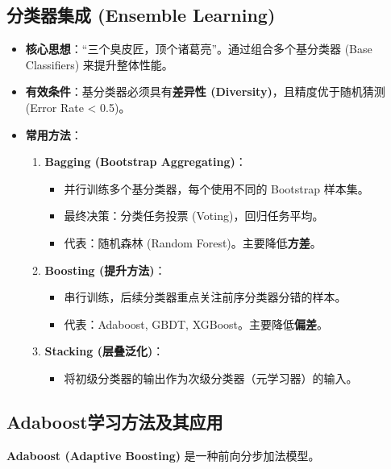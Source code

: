 \documentclass[a4paper, 11pt]{ctexart}
\begin{document}
\subsection{分类器集成 (Ensemble Learning)}
\begin{itemize}
    \item \textbf{核心思想}：“三个臭皮匠，顶个诸葛亮”。通过组合多个基分类器 (Base Classifiers) 来提升整体性能。
    \item \textbf{有效条件}：基分类器必须具有\textbf{差异性 (Diversity)}，且精度优于随机猜测 (Error Rate < 0.5)。
    \item \textbf{常用方法}：
    \begin{enumerate}
        \item \textbf{Bagging (Bootstrap Aggregating)}：
        \begin{itemize}
            \item 并行训练多个基分类器，每个使用不同的 Bootstrap 样本集。
            \item 最终决策：分类任务投票 (Voting)，回归任务平均。
            \item 代表：随机森林 (Random Forest)。主要降低\textbf{方差}。
        \end{itemize}
        \item \textbf{Boosting (提升方法)}：
        \begin{itemize}
            \item 串行训练，后续分类器重点关注前序分类器分错的样本。
            \item 代表：Adaboost, GBDT, XGBoost。主要降低\textbf{偏差}。
        \end{itemize}
        \item \textbf{Stacking (层叠泛化)}：
        \begin{itemize}
            \item 将初级分类器的输出作为次级分类器（元学习器）的输入。
        \end{itemize}
    \end{enumerate}
\end{itemize}

\subsection{Adaboost学习方法及其应用}
\textbf{Adaboost (Adaptive Boosting)} 是一种前向分步加法模型。
\end{document}
